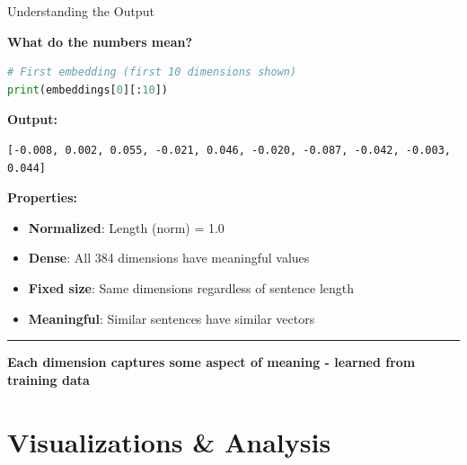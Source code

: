 \documentclass[8pt,aspectratio=169]{beamer}
\newcommand{\bottomnote}[1]{%
\vfill
\vspace{-2mm}
\textcolor{mllavender2}{\rule{\textwidth}{0.4pt}}
\vspace{1mm}
\footnotesize
\textbf{#1}
}
\begin{document}
\begin{frame}[t,fragile]{Understanding the Output}

\textbf{What do the numbers mean?}

\begin{lstlisting}[language=Python]
# First embedding (first 10 dimensions shown)
print(embeddings[0][:10])
\end{lstlisting}

\textbf{Output:}
\begin{lstlisting}
[-0.008, 0.002, 0.055, -0.021, 0.046, -0.020, -0.087, -0.042, -0.003, 0.044]
\end{lstlisting}

\vspace{0.5cm}

\textbf{Properties:}
\begin{itemize}
    \item \textbf{Normalized}: Length (norm) = 1.0
    \item \textbf{Dense}: All 384 dimensions have meaningful values
    \item \textbf{Fixed size}: Same dimensions regardless of sentence length
    \item \textbf{Meaningful}: Similar sentences have similar vectors
\end{itemize}

\bottomnote{Each dimension captures some aspect of meaning - learned from training data}
\end{frame}

\section{Visualizations \& Analysis}
\end{document}
